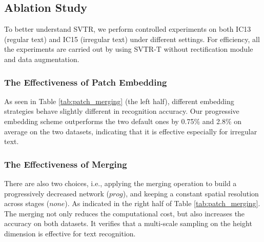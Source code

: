 \documentclass{article}
\begin{document}
\subsection{Ablation Study} \label{section:3.3}
To better understand SVTR, we perform controlled experiments on both IC13 (regular text) and IC15 (irregular text) under different settings. For efficiency, all the experiments are carried out by using SVTR-T without rectification module and data augmentation.

\subsubsection{The Effectiveness of Patch Embedding}
As seen in Table \ref{tab:patch_merging} (the left half), different embedding strategies behave slightly different in recognition accuracy. Our progressive embedding scheme outperforms the two default ones by 0.75\% and 2.8\% on average on the two datasets, indicating that it is effective especially for irregular text. 

 

\subsubsection{The Effectiveness of Merging}

There are also two choices, i.e., applying the merging operation to build a progressively decreased network ($prog$), and keeping a constant spatial resolution across stages ($none$). As indicated in the right half of Table \ref{tab:patch_merging}. The merging not only reduces the computational cost, but also increases the accuracy on both datasets. It verifies that a multi-scale sampling on the height dimension is effective for text recognition. 


\begin{table}[t]
\centering
\subtable
{ 
}

\caption{Ablation study on patch embedding (the left half) and merging (the right half).}
\label{tab:patch_merging}
\end{table}
\end{document}
